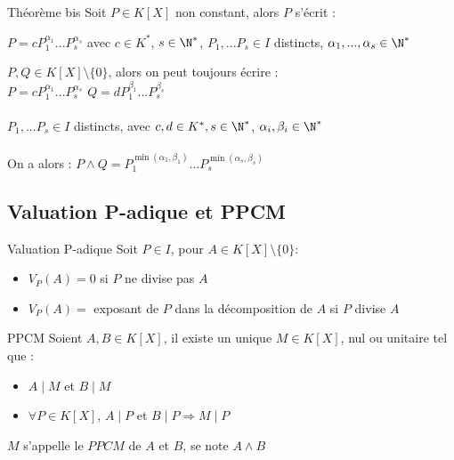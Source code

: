 \documentclass[12pt,a4paper]{report}
\begin{document}
        \begin{theoreme}{Théorème bis}{}
        Soit $P\in K[X]$ non constant, alors $P$ s'écrit : 
        \begin{center}
            $P=cP_1^{\alpha_1} ... P_s^{\alpha_s}$ 
            avec $c\in K^*$, $s\in \N^*$, $P_1 ,... P_s \in I$ distincts, $\alpha_1 , ..., \alpha_s \in \N^*$
        \end{center}
        \end{theoreme}
        
        \begin{remarque}
        $P,Q \in K[X]\setminus\lbrace 0 \rbrace$, alors on peut toujours écrire : \\
        $P=cP_1^{\alpha_1} ... P_s^{\alpha_s}$ \: \: \: $Q=dP_1^{\beta_1} ... P_s^{\beta_s}$ \\
        \\
        $P_1 ,... P_s \in I$ distincts, avec $c,d \in K^*, s \in \N^*$, $\alpha_i, \beta_i \in \N^*$ \\
        \\
        On a alors : $P\wedge Q=P_1^{\min (\alpha_1 , \beta_1)} ... P_s^{\min (\alpha_s , \beta_s)}$
        \end{remarque}

    \subsection{Valuation P-adique et PPCM}
    
    \begin{definition}{Valuation P-adique}{}
    Soit $P\in I$, pour $A\in K[X]\setminus \lbrace 0 \rbrace$: 
    \begin{itemize}
        \item $V_P (A) = 0$ si $P$ ne divise pas $A$
        \item $V_P (A) =$ exposant de $P$ dans la décomposition de $A$ si $P$ divise $A$
    \end{itemize}
    \end{definition}
    
    \begin{definition}{PPCM}{}
    Soient $A,B \in K[X]$, il existe un unique $M\in K[X]$, nul ou unitaire tel que :
    \begin{itemize}
        \item $A \mid M$ et $B\mid M$
        \item $ \forall P \in K[X]$, $A\mid P$ et $B\mid P \Longrightarrow M\mid P$
    \end{itemize}
    $M$ s'appelle le $PPCM$ de $A$ et $B$, se note $A \wedge B$
    \end{definition}
    
\end{document}
